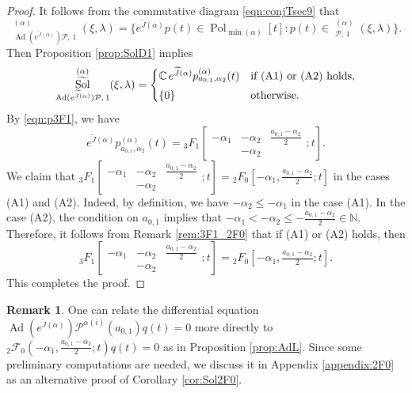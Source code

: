 \documentclass[a4paper,11pt,reqno]{amsart}
\newcommand{\CC}{\mathbb{C}}
\newcommand{\calF}{\mathcal{F}}
\newcommand{\calP}{\mathcal{P}}
\newcommand{\0}{{\bf 0}}
\newcommand{\N}{\mathbb{N}}
\newcommand{\1}{{\bf 1}}
\DeclareMathOperator{\Ad}{Ad}
\DeclareMathOperator{\Pol}{Pol}
\DeclareMathOperator{\Sol}{Sol}
\newcommand{\wJ}{\widetilde{J}}
\DeclareMathOperator{\wSol}{\widetilde{\Sol}}
\theoremstyle{plain}
\theoremstyle{definition}
\newtheorem{remark}[equation]{Remark}
\numberwithin{equation}{section}
\theoremstyle{definition}
\begin{document}
\begin{proof}
It follows from the commutative diagram \eqref{eqn:conjTsec9} that 
\begin{equation*}
\wSol_{\Ad(e^{\wJ(\alpha)}) \calP,\, 1}^{(\alpha)}(\xi,\lambda)
=\{e^{\wJ(\alpha)}p(t) \in \Pol_{\min(\alpha)}[t] : p(t) \in \wSol_{\calP,\, 1}^{(\alpha)}(\xi,\lambda)\}.
\end{equation*}
Then Proposition \ref{prop:SolD1} implies
\begin{equation*}
\wSol_{\Ad(e^{\wJ(\alpha)}) \calP,\, 1}^{(\alpha)}(\xi,\lambda)
=
\begin{cases}
\CC\,
e^{\wJ(\alpha)}p_{a_{0,1},\alpha_2}^{(\alpha)}(t) & 
\textnormal{if (A1) or (A2) holds,}\\[3pt]
\{0\} & \textnormal{otherwise.}
\end{cases}
\end{equation*}
By \eqref{eqn:p3F1}, we have 
\begin{equation*}
e^{\wJ(\alpha)}p_{a_{0,1},\alpha_2}^{(\alpha)}(t) 
= {}_3F_1
\left [\begin{matrix}
-\alpha_1& -\alpha_2 & \frac{a_{0,1}-\alpha_2}{2} \\
& -\alpha_2 &  
\end{matrix};t\right ].
\end{equation*}
We claim that 
$ {}_3F_1
\left [\begin{matrix}
-\alpha_1& -\alpha_2 & \frac{a_{0,1}-\alpha_2}{2} \\
& -\alpha_2 &  
\end{matrix};t\right ] 
= 
{}_2F_0[-\alpha_1,\tfrac{a_{0,1}-\alpha_2}{2};t]$
in the cases (A1) and (A2).
Indeed, by definition, we have $-\alpha_2 \leq -\alpha_1$ in the case (A1).
In the case (A2), the condition on $a_{0,1}$ implies that  
$-\alpha_1 < -\alpha_2 \leq - \tfrac{a_{0,1}-\alpha_2}{2} \in \N$.
Therefore, it follows from Remark \ref{rem:3F1_2F0} that
if (A1) or (A2) holds, then
\begin{equation*}
{}_3F_1
\left [\begin{matrix}
-\alpha_1& -\alpha_2 & \frac{a_{0,1}-\alpha_2}{2} \\
& -\alpha_2 &  
\end{matrix};t\right ]
=
{}_2F_0[-\alpha_1,\tfrac{a_{0,1}-\alpha_2}{2};t].
\end{equation*}
This completes the proof.
\end{proof}

\begin{remark}
One can relate the differential equation
$\Ad(e^{\wJ(\alpha)})\calP^{\alpha(i)}(a_{0,1})q(t)=0$
more directly to 
${}_2\calF_0(-\alpha_1,\tfrac{a_{0,1}-\alpha_2}{2};t)q(t)=0$
as in Proposition \ref{prop:AdL}.
Since some preliminary computations are needed,
we discuss it in Appendix \ref{appendix:2F0}
as an alternative proof of Corollary \ref{cor:Sol2F0}.
\end{remark}
\end{document}
